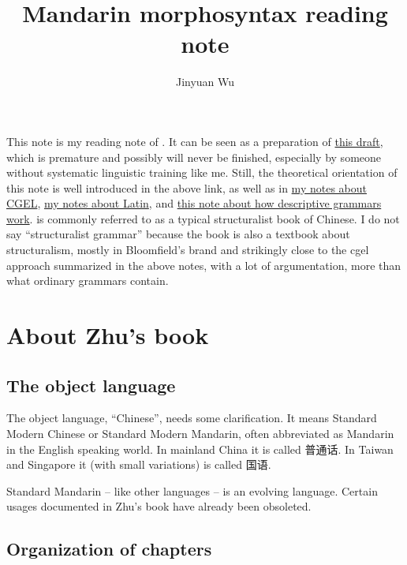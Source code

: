 \documentclass[UTF8, a4paper, oneside, scheme=plain]{ctexart}
\title{Mandarin morphosyntax reading note}
\author{Jinyuan Wu}
\newcommand{\cgel}{\href{../English/cambridge.pdf}{my notes about CGEL}}
\newcommand{\latin}{\href{../Latin/latin-notes.pdf}{my notes about Latin}}
\newcommand{\method}{\href{../methodology/glossing.pdf}{this note about how descriptive grammars work}}
\newcommand{\draft}{\href{./main.pdf}{this draft}}
\begin{document}
\maketitle

\automath

This note is my reading note of \citet{zhudexigrammar}.
It can be seen as a preparation of \draft,
which is premature and possibly will never be finished,
especially by someone without systematic linguistic training like me.
Still, the theoretical orientation of this note is well introduced in the above link,
as well as in \cgel, \latin, and \method.
\citet{zhudexigrammar} is commonly referred to as a typical structuralist book of Chinese.
I do not say ``structuralist grammar'' because the book is also a textbook about structuralism,
mostly in Bloomfield's brand
and strikingly close to the \ac{cgel} \citep{cgel} approach summarized in the above notes,
with a lot of argumentation, more than what ordinary grammars contain.

\section{About Zhu's book}

\subsection{The object language}

The object language, ``Chinese'', needs some clarification.
It means Standard Modern Chinese or Standard Modern Mandarin,
often abbreviated as Mandarin in the English speaking world.
In mainland China it is called 普通话.
In Taiwan and Singapore it (with small variations) is called 国语.

Standard Mandarin -- like other languages -- is an evolving language.
Certain usages documented in Zhu's book have already been obsoleted.

\subsection{Organization of chapters}\label{sec:organization-chapter}
\end{document}
